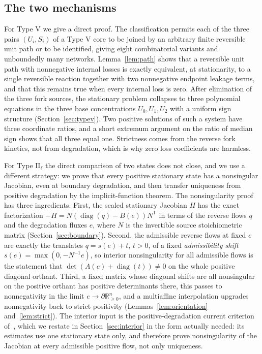 \documentclass[11pt,a4paper]{article}
\theoremstyle{plain}
\theoremstyle{definition}
\theoremstyle{remark}
\numberwithin{equation}{section}
\newcommand{\R}{\mathbb{R}}
\newcommand{\diag}{\operatorname{diag}}
\newcommand{\II}{\mathrm{II}}
\newcommand{\V}{\mathrm{V}}
\begin{document}
\subsection*{The two mechanisms}
For Type $\V$ we give a direct proof. The classification permits each of the three pairs $(U_i,S_i)$ of a Type $\V$ core to be joined by an arbitrary finite reversible unit path or to be identified, giving eight combinatorial variants and unboundedly many networks. Lemma~\ref{lem:path} shows that a reversible unit path with nonnegative internal losses is exactly equivalent, at stationarity, to a single reversible reaction together with two nonnegative endpoint leakage terms, and that this remains true when every internal loss is zero. After elimination of the three fork sources, the stationary problem collapses to three polynomial equations in the three base concentrations $U_0,U_1,U_2$ with a uniform sign structure (Section~\ref{sec:typev}). Two positive solutions of such a system have three coordinate ratios, and a short extremum argument on the ratio of median sign shows that all three equal one. Strictness comes from the reverse fork kinetics, not from degradation, which is why zero loss coefficients are harmless.

For Type $\II_\ell$ the direct comparison of two states does not close, and we use a different strategy: we prove that every positive stationary state has a nonsingular Jacobian, even at boundary degradation, and then transfer uniqueness from positive degradation by the implicit-function theorem. The nonsingularity proof has three ingredients. First, the scaled stationary Jacobian $H$ has the exact factorization $-H=N(\diag(q)-B(e))N^{\mathsf T}$ in terms of the reverse flows $q$ and the degradation fluxes $e$, where $N$ is the invertible source stoichiometric matrix (Section~\ref{sec:boundary}). Second, the admissible reverse flows at fixed $e$ are exactly the translates $q=s(e)+t$, $t>0$, of a fixed \emph{admissibility shift} $s(e)=\max(0,-N^{-1}e)$, so interior nonsingularity for all admissible flows is the statement that $\det(A(e)+\diag(t))\neq0$ on the whole positive diagonal orthant. Third, a fixed matrix whose diagonal shifts are all nonsingular on the positive orthant has positive determinants there, this passes to nonnegativity in the limit $e\to\partial\R^n_{\ge0}$, and a multiaffine interpolation upgrades nonnegativity back to strict positivity (Lemmas~\ref{lem:orientation} and~\ref{lem:strict}). The interior input is the positive-degradation current criterion of~\cite{TypeIIpos}, which we restate in Section~\ref{sec:interior} in the form actually needed: its estimates use one stationary state only, and therefore prove nonsingularity of the Jacobian at every admissible positive flow, not only uniqueness.
\end{document}
